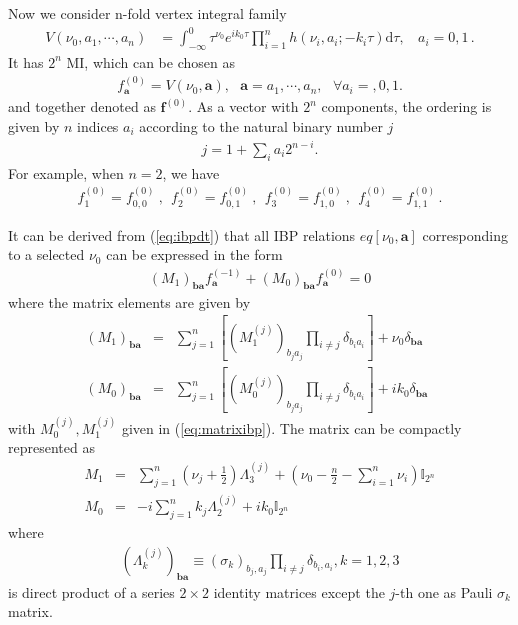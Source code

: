 \documentclass[a4paper,11pt]{article}
\newcommand{\nn}{\nonumber}
\newcommand{\nd}{\mathrm{d}}
\def\eqref#1{(\ref{#1})}
\newcommand{\bea}{\begin{eqnarray}}
\newcommand{\eea}{\end{eqnarray}}
\begin{document}
Now we consider  n-fold vertex integral family
\begin{align}
V(\nu_0,a_1,\cdots,a_n)&=\int_{-\infty}^0 \tau^{\nu_0} e^{ik_0 \tau} 
  \prod_{i=1}^n h(\nu_i,a_i;-k_i\tau)\nd \tau ,~~~~ a_i=0,1 \,.
\end{align}
It has $2^n$ MI, which can be chosen as
\begin{align}
f^{(0)}_{\bm{a}}=V(\nu_0,\bm{a}), ~~~\bm{a}=a_1,\cdots,a_n,~~~\forall a_i=,0,1.
\end{align}
and together denoted as $\bm{f}^{(0)}$. As a vector with $2^n$ components, 
the ordering is given by %
$n$ indices $a_i$ according to  the natural binary  number $j$
\begin{align}
j=1+\sum_i a_i 2^{n-i}.
\end{align}
For example, when $n=2$, we have 
\begin{align}
f^{(0)}_1=f^{(0)}_{0,0}~,~~f^{(0)}_2=f^{(0)}_{0,1} ~,~~f^{(0)}_3=f^{(0)}_{1,0}~,~~f^{(0)}_4=f^{(0)}_{1,1}  \, .
\end{align} 

It can be derived from \eqref{eq:ibpdt} that  all IBP relations $eq[\nu_0,\bm{a}]$  corresponding to a selected $\nu_0$ can be expressed in the form
%
\bea \left(M_1\right)_{\bm{b}\bm{a}} f^{(-1)}_{\bm{a}}+\left(M_0\right)_{\bm{b}\bm{a}} f^{(0)}_{\bm{a}}=0 \label{eq:matrixindxibpn}\eea
%
where the matrix elements are given by 
%
\bea \left(M_1\right)_{\bm{b}\bm{a}} & = &  \sum_{j=1}^n \left[ \left(M_{1}^{(j)}\right)_{b_j a_j} \prod_{i\neq j}\delta_{b_i a_i} \right] + \nu_0 \delta_{\bm{b}\bm{a}}  \nn\\
%
\left(M_0\right)_{\bm{b}\bm{a}} &= &  \sum_{j=1}^n \left[ \left(M_{0}^{(j)}\right)_{b_j a_j} \prod_{i\neq j}\delta_{b_i a_i} \right] + ik_0 \delta_{\bm{b}\bm{a}}~~\label{eq:matrixibpn-1}\eea
%
with $M_{0}^{(j)},M_{1}^{(j)}$ given in \eqref{eq:matrixibp}. The matrix can be
compactly represented as 
%
\bea  M_1 &= & \sum_{j=1}^n \left(\nu_j+\frac{1}{2}\right)\Lambda_3^{(j)} + \left(\nu_0-\frac{n}{2}-\sum_{i=1}^n \nu_i\right)\mathbb{I}_{2^n}  \nn  \\
%
M_0 &= &-i \sum_{j=1}^n k_j \Lambda_2^{(j)} + i k_0 \mathbb{I}_{2^n} \label{eq:matrixibpn-2} \eea
%
where
%
\bea \left(\Lambda_k^{(j)}\right)_{\bm{b} \bm{a}}\equiv \left(\sigma_k\right)_{b_j,a_j} \prod_{i\neq j}\delta_{b_i,a_i} , k=1,2,3 \label{eq:LambdaMatrix} \eea
%
is direct product of a series $2\times 2$ identity matrices except the $j$-th one as Pauli $\sigma_k$ matrix.
\end{document}
